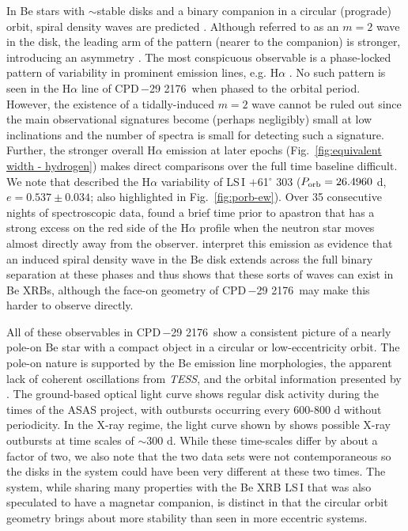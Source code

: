 \documentclass[]{aastex631}
\newcommand{\target}{CPD\,$-$29 2176}
\begin{document}
In Be stars with $\sim$stable disks and a binary companion in a circular (prograde) orbit, spiral density waves are predicted \citep{2016MNRAS.461.2616P, 2018MNRAS.473.3039P}.  Although referred to as an $m=2$ wave in the disk, the leading arm of the pattern (nearer to the companion) is stronger, introducing an asymmetry \citep{2020MNRAS.497.3525C}. The most conspicuous observable is a phase-locked pattern of variability in prominent emission lines, e.g. H$\alpha$ \citep[e.g.]{2013A&A...560A..30Z, Chojnowski2018, 2020A&A...639A..32H}. No such pattern is seen in the H$\alpha$ line of \target\ when phased to the orbital period. However, the existence of a tidally-induced $m=2$ wave cannot be ruled out since the main observational signatures become (perhaps negligibly) small at low inclinations and the number of spectra is small for detecting such a signature. Further, the stronger overall H$\alpha$ emission at later epochs (Fig.~\ref{fig:equivalent width - hydrogen}) makes direct comparisons over the full time baseline difficult. We note that \citet{2010ApJ...724..379M} described the H$\alpha$ variability of LS\,I $+$61$^\circ$ 303 ($P_{\rm orb} = 26.4960$ d, $e=0.537\pm0.034$; also highlighted in Fig.~\ref{fig:porb-ew}). Over 35 consecutive nights of spectroscopic data, \citet{2010ApJ...724..379M} found a brief time prior to apastron that has a strong excess on the red side of the H$\alpha$ profile when the neutron star moves almost directly away from the observer. \citet{2010ApJ...724..379M} interpret this emission as evidence that an induced spiral density wave in the Be disk extends across the full binary separation at these phases and thus shows that these sorts of waves can exist in Be XRBs, although the face-on geometry of \target\ may make this harder to observe directly. 


All of these observables in \target\ show a consistent picture of a nearly pole-on Be star with a compact object in a circular or low-eccentricity orbit. The pole-on nature is supported by the Be emission line morphologies, the apparent lack of coherent oscillations from \textit{TESS}, and the orbital information presented by \citet{noel}. The ground-based optical light curve shows regular disk activity during the times of the ASAS project, with outbursts occurring every 600-800 d without periodicity. In the X-ray regime, the light curve shown by \citet{2023arXiv230713308N} shows possible X-ray outbursts at time scales of $\sim 300$ d. While these time-scales differ by about a factor of two, we also note that the two data sets were not contemporaneous so the disks in the system could have been very different at these two times. The system, while sharing many properties with the Be XRB LS\,I that was also speculated to have a magnetar companion, is distinct in that the circular orbit geometry brings about more stability than seen in more eccentric systems.
\end{document}
